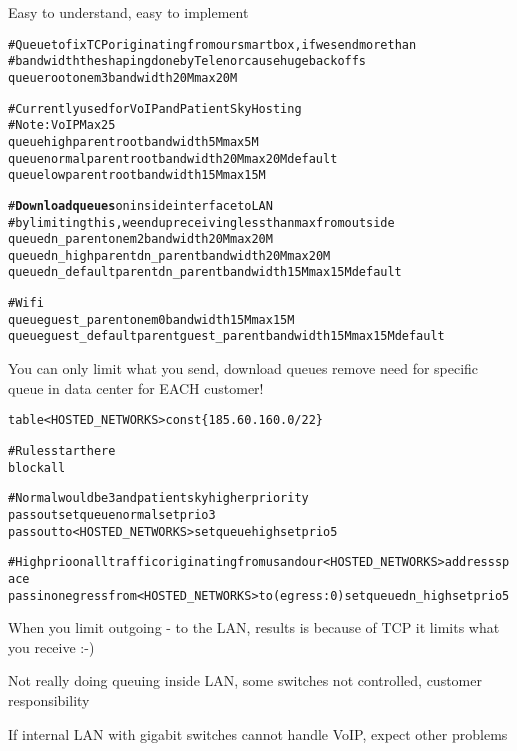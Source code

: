 \documentclass[Screen16to9,17pt]{foils}
\begin{document}
Easy to understand, easy to implement


\begin{alltt}\footnotesize
# Queue to fix TCP originating from our smartbox, if we send more than
# bandwidth the shaping done by Telenor cause huge backoffs
queue root on em3 bandwidth 20M max 20M

# Currently used for VoIP and PatientSky Hosting
# Note: VoIP Max 25% of bandwidth, excess dropped by provider!
queue high parent root bandwidth 5M max 5M
queue normal parent root bandwidth 20M max 20M default
queue low parent root bandwidth 15M max 15M

# {\bf Download queues} on inside interface to LAN
# by limiting this, we end up receiving less than max from outside
queue dn_parent on em2 bandwidth 20M max 20M
queue dn_high parent dn_parent bandwidth 20M max 20M
queue dn_default parent dn_parent bandwidth 15M max 15M default

# Wifi
queue guest_parent on em0 bandwidth 15M max 15M
queue guest_default parent guest_parent bandwidth 15M max 15M default
\end{alltt}

You can only limit what you send, download queues remove need for
specific queue in data center for EACH customer!


\begin{alltt}\footnotesize
table <HOSTED_NETWORKS> const \{ 185.60.160.0/22 \}

# Rules start here
block all

# Normal would be 3 and patientsky higher priority
pass out set queue normal set prio 3
pass out to <HOSTED_NETWORKS> set queue high set prio 5

# High prio on all traffic originating from us and our <HOSTED_NETWORKS> address space
pass in on egress from <HOSTED_NETWORKS> to (egress:0) set queue dn_high set prio 5
\end{alltt}

\begin{list2}
\item When you limit outgoing - to the LAN, results is because of TCP it limits what you receive :-)
\item Not really doing queuing inside LAN, some switches not controlled, customer responsibility
\item If internal LAN with gigabit switches cannot handle VoIP, expect other problems
\end{list2}
\end{document}
